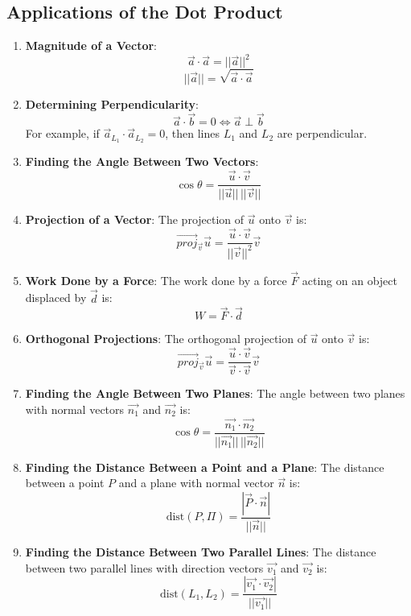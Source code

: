 \documentclass[a4paper,12pt,openany]{book}
\begin{document}
\subsection{Applications of the Dot Product}
\begin{enumerate}
    \item \textbf{Magnitude of a Vector}:
    \[
        \vec{a} \cdot \vec{a} = ||\vec{a}||^2
    \]
    \[
        ||\vec{a}|| = \sqrt{\vec{a} \cdot \vec{a}}
    \]

    \item \textbf{Determining Perpendicularity}:
    \[
        \vec{a} \cdot \vec{b} = 0 \iff \vec{a} \perp \vec{b}
    \]
    For example, if \(\vec{a}_{L_1} \cdot \vec{a}_{L_2} = 0\), then lines \(L_1\) and \(L_2\) are perpendicular.

    \item \textbf{Finding the Angle Between Two Vectors}:
    \[
        \cos{\theta} = \dfrac{\vec{u} \cdot \vec{v}}{||\vec{u}|| \, ||\vec{v}||}
    \]

    \item \textbf{Projection of a Vector}:
    The projection of \(\vec{u}\) onto \(\vec{v}\) is:
    \[
        \vec{proj}_{\vec{v}} \vec{u} = \dfrac{\vec{u} \cdot \vec{v}}{||\vec{v}||^2} \vec{v}
    \]

    \item \textbf{Work Done by a Force}:
    The work done by a force \(\vec{F}\) acting on an object displaced by \(\vec{d}\) is:
    \[
        W = \vec{F} \cdot \vec{d}
    \]

    \item \textbf{Orthogonal Projections}:
    The orthogonal projection of \(\vec{u}\) onto \(\vec{v}\) is:
    \[
        \vec{proj}_{\vec{v}} \vec{u} = \dfrac{\vec{u} \cdot \vec{v}}{\vec{v} \cdot \vec{v}} \vec{v}
    \]

    \item \textbf{Finding the Angle Between Two Planes}:
    The angle between two planes with normal vectors \(\vec{n_1}\) and \(\vec{n_2}\) is:
    \[
        \cos{\theta} = \dfrac{\vec{n_1} \cdot \vec{n_2}}{||\vec{n_1}|| \, ||\vec{n_2}||}
    \]

    \item \textbf{Finding the Distance Between a Point and a Plane}:
    The distance between a point \(P\) and a plane with normal vector \(\vec{n}\) is:
    \[
        \text{dist}(P, \Pi) = \dfrac{|\vec{P} \cdot \vec{n}|}{||\vec{n}||}
    \]

    \item \textbf{Finding the Distance Between Two Parallel Lines}:
    The distance between two parallel lines with direction vectors \(\vec{v_1}\) and \(\vec{v_2}\) is:
    \[
        \text{dist}(L_1, L_2) = \dfrac{|\vec{v_1} \cdot \vec{v_2}|}{||\vec{v_1}||}
    \]

    
\end{enumerate}
\end{document}
